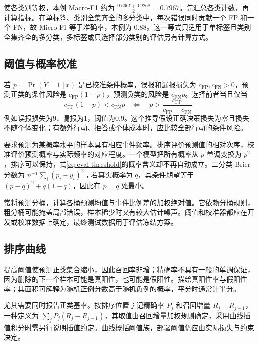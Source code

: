 \documentclass[../textbook.tex]{subfiles}
\begin{document}
使各类别等权，本例 Macro-F1 约为 $\frac{0.6667+0.9268}{2}=0.7967$。先汇总各类计数，再计算指标。在单标签、类别全集齐全的多分类中，每次错误同时贡献一个 FP 和一个 FN，故 Micro-F1 等于准确率，本例为 $0.88$。这一等式只适用于单标签且类别全集齐全的多分类，多标签或只选择部分类别的评估另有计算方式。

\subsection{阈值与概率校准}
若 $p=\Pr(Y=1\mid x)$ 是已校准条件概率，误报和漏报损失为 $c_{\mathrm{FP}},c_{\mathrm{FN}}>0$，预测正类的条件风险是 $c_{\mathrm{FP}}(1-p)$，预测负类的风险是 $c_{\mathrm{FN}}p$。选择前者当且仅当
\begin{equation}
 c_{\mathrm{FP}}(1-p)<c_{\mathrm{FN}}p
 \quad\Longleftrightarrow\quad
 p>\frac{c_{\mathrm{FP}}}{c_{\mathrm{FP}}+c_{\mathrm{FN}}}.
 \label{eq:eval-threshold}
\end{equation}
例如误报损失为9、漏报为1，阈值为0.9。这个推导假设正确决策损失为零且损失不随个体变化；有额外行动、拒答或个体成本时，应比较全部行动的条件风险。

要求预测为某概率水平的样本具有相应事件频率。排序评价预测值的相对次序，校准评价预测概率与实际频率的对应程度。一个模型把所有概率从 $p$ 单调变换为 $p^2$，排序可以保持，式\eqref{eq:eval-threshold}的概率含义却不再自动成立。二分类 Brier 分数为 $n^{-1}\sum_i(p_i-y_i)^2$；若真实概率为 $q$，其条件期望等于 $(p-q)^2+q(1-q)$，因此在 $p=q$ 处最小。

常将预测分桶，计算各桶预测均值与事件比例差的加权绝对值。它依赖分桶规则，粗分桶可能掩盖局部错误，样本稀少时又有较大估计噪声。阈值和校准器都应在开发或校准数据上确定，最终测试数据用于评估冻结方案。

\subsection{排序曲线}
提高阈值使预测正类集合缩小，因此召回率非增；精确率不具有一般的单调保证，因为删除的下一个样本可能是真阳性，也可能是假阳性。描绘真阳性率与假阳性率；其面积可解释为随机正例分数高于随机负例的概率，平分时通常计半分。

尤其需要同时报告正类基率。按排序位置 $j$ 记精确率 $P_j$ 和召回增量 $R_j-R_{j-1}$，一种定义为 $\sum_jP_j(R_j-R_{j-1})$，其取值由召回增量加权规则确定，采用曲线插值积分时需另行说明插值约定。曲线概括阈值族，部署阈值仍应由实际损失与约束决定。
\end{document}
